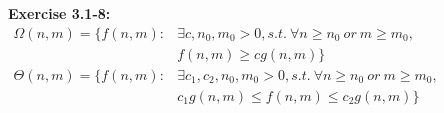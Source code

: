 \documentclass{article}
\begin{document}
\begin{spacing}{2.0}
\noindent
\textbf{Exercise 3.1-8:}\\
$
\begin{aligned}
\Omega(n, m) = \{f(n, m): &\exists c, n_0, m_0 > 0, s.t.\ \forall n \ge n_0\ or\ m \ge m_0, \\
&f(n, m) \ge cg(n, m)\}\\
\Theta(n, m) = \{f(n, m): &\exists c_1, c_2, n_0, m_0 > 0, s.t.\ \forall n \ge n_0\ or\ m \ge m_0, \\
&c_1g(n, m) \le f(n, m) \le c_2g(n, m)\}\\
\end{aligned}
$
\end{spacing}
\end{document}

